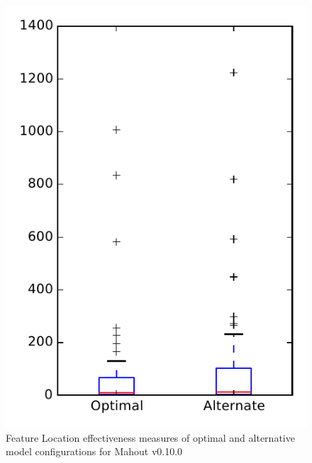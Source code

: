 
\begin{figure}
\centering
\includegraphics[height=0.4\textheight]{figures/combo/flt_rq1_mahout}
\caption{Feature Location effectiveness measures of optimal and alternative model configurations for Mahout v0.10.0}
\label{fig:combo:flt:rq1:mahout}
\end{figure}
